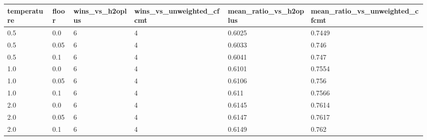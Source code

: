 \begin{tabular}{llllll}
\toprule
temperature & floor & wins\_vs\_h2oplus & wins\_vs\_unweighted\_cfcmt & mean\_ratio\_vs\_h2oplus & mean\_ratio\_vs\_unweighted\_cfcmt \\
\midrule
0.5 & 0.0 & 6 & 4 & 0.6025 & 0.7449 \\
0.5 & 0.05 & 6 & 4 & 0.6033 & 0.746 \\
0.5 & 0.1 & 6 & 4 & 0.6041 & 0.747 \\
1.0 & 0.0 & 6 & 4 & 0.6101 & 0.7554 \\
1.0 & 0.05 & 6 & 4 & 0.6106 & 0.756 \\
1.0 & 0.1 & 6 & 4 & 0.611 & 0.7566 \\
2.0 & 0.0 & 6 & 4 & 0.6145 & 0.7614 \\
2.0 & 0.05 & 6 & 4 & 0.6147 & 0.7617 \\
2.0 & 0.1 & 6 & 4 & 0.6149 & 0.762 \\
\bottomrule
\end{tabular}
